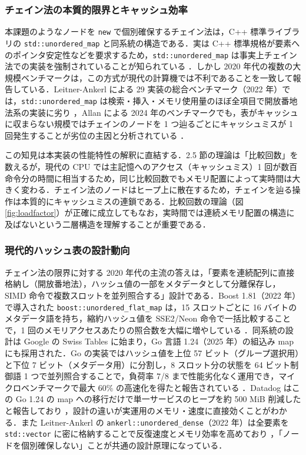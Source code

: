 \subsubsection{チェイン法の本質的限界とキャッシュ効率}

本課題のようなノードを {\tt new} で個別確保するチェイン法は，C++ 標準ライブラリの {\tt std::unordered\_map} と同系統の構造である．実は C++ 標準規格が要素へのポインタ安定性などを要求するため，{\tt std::unordered\_map} は事実上チェイン法での実装を強制されていることが知られている \cite{munoz2022std}．しかし 2020 年代の複数の大規模ベンチマークは，この方式が現代の計算機では不利であることを一致して報告している．Leitner-Ankerl による 29 実装の総合ベンチマーク（2022 年）では，{\tt std::unordered\_map} は検索・挿入・メモリ使用量のほぼ全項目で開放番地法系の実装に劣り \cite{ankerl2022bench}，Allan による 2024 年のベンチマークでも，表がキャッシュに収まらない規模ではチェインのノードを 1 つ辿るごとにキャッシュミスが 1 回発生することが劣位の主因と分析されている \cite{allan2024bench}．

この知見は本実装の性能特性の解釈に直結する．2.5 節の理論は「比較回数」を数えるが，現代の CPU では主記憶へのアクセス（キャッシュミス）1 回が数百命令分の時間に相当するため，同じ比較回数でもメモリ配置によって実時間は大きく変わる．チェイン法のノードはヒープ上に散在するため，チェインを辿る操作は本質的にキャッシュミスの連鎖である．比較回数の理論（図 \ref{fig:loadfactor}）が正確に成立してもなお，実時間では連続メモリ配置の構造に及ばないという二層構造を理解することが重要である．

\subsubsection{現代的ハッシュ表の設計動向}

チェイン法の限界に対する 2020 年代の主流の答えは，「要素を連続配列に直接格納し（開放番地法），ハッシュ値の一部をメタデータとして分離保存し，SIMD 命令で複数スロットを並列照合する」設計である．Boost 1.81（2022 年）で導入された {\tt boost::unordered\_flat\_map} は，15 スロットごとに 16 バイトのメタデータ語を持ち，縮約ハッシュ値を SSE2/Neon 命令で一括比較することで，1 回のメモリアクセスあたりの照合数を大幅に増やしている \cite{munoz2022flat}．同系統の設計は Google の Swiss Tables に始まり，Go 言語 1.24（2025 年）の組込み map にも採用された．Go の実装ではハッシュ値を上位 57 ビット（グループ選択用）と下位 7 ビット（メタデータ用）に分割し，8 スロット分の状態を 64 ビット制御語 1 つで並列照合することで，負荷率 7/8 まで性能劣化なく運用でき，マイクロベンチマークで最大 60\% の高速化を得たと報告されている \cite{gopratt2025}．Datadog はこの Go 1.24 の map への移行だけで単一サービスのヒープを約 500 MiB 削減したと報告しており \cite{datadog2025}，設計の違いが実運用のメモリ・速度に直接効くことがわかる．また Leitner-Ankerl の {\tt ankerl::unordered\_dense}（2022 年）は全要素を {\tt std::vector} に密に格納することで反復速度とメモリ効率を高めており \cite{unordereddense2022}，「ノードを個別確保しない」ことが共通の設計原理になっている．

